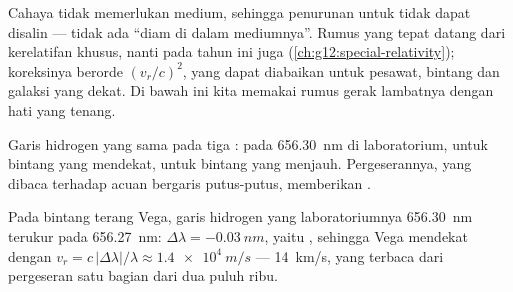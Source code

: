 \begin{remark}\label{rem:g12:doppler-effect:honest}
Cahaya tidak memerlukan medium, sehingga penurunan untuk  tidak dapat disalin ---
tidak ada ``diam di dalam mediumnya''. Rumus yang tepat datang dari kerelatifan khusus,
nanti pada tahun ini juga (\cref{ch:g12:special-relativity}); koreksinya berorde
$(v_r/c)^2$, yang dapat diabaikan untuk pesawat, bintang dan galaksi yang dekat. Di bawah
ini kita memakai rumus gerak lambatnya dengan hati yang tenang.
\end{remark}

\begin{omfigure}

{\small Garis hidrogen yang sama pada tiga : pada \qty{656.30}{nm} di
laboratorium,  untuk bintang yang mendekat,  untuk bintang yang
menjauh. Pergeserannya, yang dibaca terhadap acuan bergaris putus-putus, memberikan
.}
\end{omfigure}

\begin{example}\label{ex:g12:doppler-effect:vega}
Pada  bintang terang Vega, garis hidrogen yang  laboratoriumnya
\qty{656.30}{nm} terukur pada \qty{656.27}{nm}: $\Delta\lambda = \qty{-0.03}{nm}$, yaitu
, sehingga Vega mendekat dengan
$v_r = c\,|\Delta\lambda|/\lambda \approx \qty{1.4e4}{m/s}$ --- \qty{14}{km/s}, yang
terbaca dari pergeseran satu bagian dari dua puluh ribu.
\end{example}

